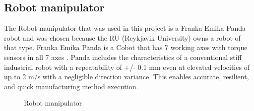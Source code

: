 \subsection{Robot manipulator\label{subsec:robot}}
The Robot manipulator that was used in this project is a Franka Emika Panda robot and was chosen because the RU (Reykjavik University) owns a robot of that type. Franka Emika Panda is a Cobot that has 7 working axes with torque sensors in all 7 axes \cite{gmbh_franka_nodate}. Panda includes the characteristics of a conventional stiff industrial robot with a repeatability of +/- 0.1 mm even at elevated velocities of up to 2 m/s with a negligible direction variance. This enables accurate, resilient, and quick manufacturing method execution. 
\begin{figure}[h]
    \centering
    \hfill
    \caption{Robot manipulator}
    \label{figure: frankaemika}
\end{figure}

